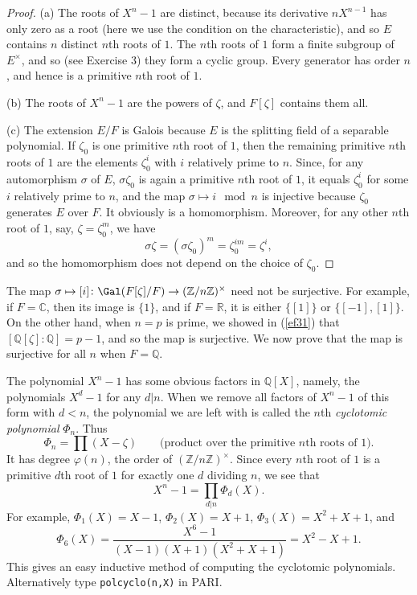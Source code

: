 \documentclass[a4paper,11pt,final,openany]{memoir}
\theoremstyle{nonumberplain}
\newtheorem{proof}{Proof.}
\begin{document}
\begin{proof}
(a) The roots of $X^{n}-1$ are distinct, because its derivative $nX^{n-1}$ has
only zero as a root (here we use the condition on the characteristic), and so
$E$ contains $n$ distinct $n$th roots of $1$. The $n$th roots of $1$ form a
finite subgroup of $E^{\times}$, and so (see Exercise 3) they form a cyclic
group. Every generator has order $n$, and hence is a primitive $n$th root of
$1$.

(b) The roots of $X^{n}-1$ are the powers of $\zeta$, and $F[\zeta]$ contains
them all.

(c) The extension $E/F$ is Galois because $E$ is the splitting field of a
separable polynomial. If $\zeta_{0}$ is one primitive $n$th root of $1$, then
the remaining primitive $n$th roots of $1$ are the elements $\zeta_{0}^{i}$
with $i$ relatively prime to $n$. Since, for any automorphism $\sigma$ of $E$,
$\sigma\zeta_{0}$ is again a primitive $n$th root of $1$, it equals $\zeta
_{0}^{i}$ for some $i$ relatively prime to $n$, and the map $\sigma\mapsto
i\mod n$ is injective because $\zeta_{0}$ generates $E$ over $F$. It obviously
is a homomorphism. Moreover, for any other $n$th root of $1$, say,
$\zeta=\zeta_{0}^{m}$, we have
\[
\sigma\zeta=(\sigma\zeta_{0})^{m}=\zeta_{0}^{im}=\zeta^{i},
\]
and so the homomorphism does not depend on the choice of $\zeta_{0}$.
\end{proof}

The map $\sigma\mapsto\lbrack i]\colon\Gal(F[\zeta]/F)\rightarrow
(\mathbb{Z}/n\mathbb{Z})^{\times}$ need not be surjective. For example, if
$F=\mathbb{C}$, then its image is $\{1\}$, and if $F=\mathbb{R}$, it is either
$\{[1]\}$ or $\{[-1],[1]\}$. On the other hand, when $n=p$ is prime, we showed
in (\ref{ef31}) that $[\mathbb{Q}[\zeta]\colon\mathbb{Q}]=p-1$, and so the map
is surjective. We now prove that the map is surjective for all $n$ when
$F=\mathbb{Q}$.

The polynomial $X^{n}-1$ has some obvious factors in $\mathbb{Q}[X]$, namely,
the polynomials $X^{d}-1$ for any $d|n$. When we remove all factors of
$X^{n}-1$ of this form with $d<n$, the polynomial we are left with is called
the $n$th \emph{cyclotomic polynomial}%
$\Phi_{n}$. Thus
\[
\Phi_{n}=\prod(X-\zeta)\qquad\text{(product over the primitive }n{\text{th}%
}\text{\ roots of }1).
\]
It has degree%
$\varphi(n)$, the order of $(\mathbb{Z}/n\mathbb{Z})^{\times}$. Since every
$n$th root of $1$ is a primitive $d$th root of $1$ for exactly one $d$
dividing $n$, we see that
\[
X^{n}-1=\prod_{d|n}\Phi_{d}(X).
\]
For example, $\Phi_{1}(X)=X-1$, $\Phi_{2}(X)=X+1$, $\Phi_{3}(X)=X^{2}+X+1$,
and
\[
\Phi_{6}(X)=\frac{X^{6}-1}{(X-1)(X+1)(X^{2}+X+1)}=X^{2}-X+1.
\]
This gives an easy inductive method of computing the cyclotomic polynomials.
Alternatively type
%
\texttt{polcyclo(n,X)} in PARI.
\end{document}
